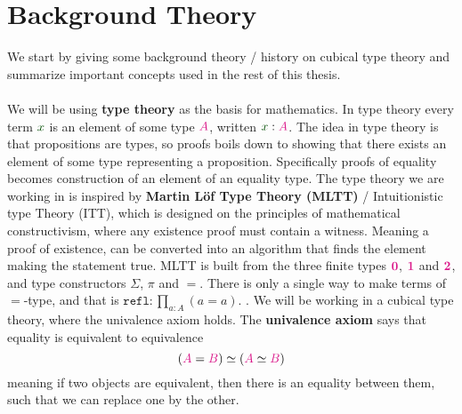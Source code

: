 \documentclass[twoside,11pt,openright]{report}
\theoremstyle{plain} %
\theoremstyle{definition}
\theoremstyle{remark}
\newcommand*{\term}[1]{\textcolor{green!30!black}{#1}} %
\newcommand*{\type}[1]{\textcolor{magenta!90!black}{#1}}
\newcommand*{\unit}{\type{\textbf{1}}}
\newcommand*{\empt}{\type{\textbf{0}}}
\begin{document}

\section{Background Theory}
We start by giving some background theory / history on cubical type theory and summarize important concepts used in the rest of this thesis. 
\\ \\
We will be using \textbf{type theory} as the basis for mathematics. In type theory every term \(\term{x}\) is an element of some type \(\type{A}\), written \(\term{x} : \type{A}\). The idea in type theory is that propositions are types, so proofs boils down to showing that there exists an element of some type representing a proposition. Specifically proofs of equality becomes construction of an element of an equality type. The type theory we are working in is inspired by \textbf{Martin L\"of Type Theory (MLTT)} / Intuitionistic type Theory (ITT), which is designed on the principles of mathematical constructivism, where any existence proof must contain a witness. Meaning a proof of existence, can be converted into an algorithm that finds the element making the statement true. MLTT is built from the three finite types \(\empt\), \(\unit\) and \(\type{\mathbf{2}}\), and type constructors \(\Sigma\), \(\pi\) and \(=\). There is only a single way to make terms of \(=\)-type, and that is \(\mathtt{refl} : \prod_{a : A} (a = a)\).   . We will be working in a cubical type theory, where the univalence axiom holds. The \textbf{univalence axiom} says that equality is equivalent to equivalence
\begin{equation}
  (\type{A} = \type{B}) \simeq (\type{A} \simeq \type{B})
\end{equation}
meaning if two objects are equivalent, then there is an equality between them, such that we can replace one by the other.
\\ \\
\end{document}
